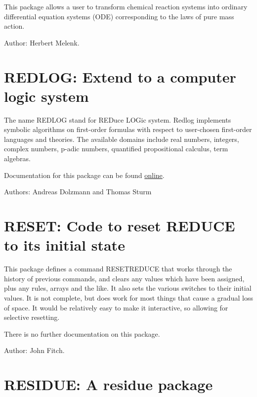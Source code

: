
This package allows a user to transform chemical reaction systems into
ordinary differential equation systems (ODE) corresponding to the laws of
pure mass action.


Author: Herbert Melenk.


\newpage

\section{REDLOG: Extend \REDUCE{} to a computer logic system}


The name REDLOG stand for REDuce LOGic system. Redlog implements
symbolic algorithms on first-order formulas with respect to
user-chosen first-order languages and theories. The available domains
include real numbers, integers, complex numbers, p-adic numbers,
quantified propositional calculus, term algebras.

Documentation for this package can be found \href{http://redlog.eu/}{online}.

Authors: Andreas Dolzmann and Thomas Sturm

\section{RESET: Code to reset REDUCE to its initial state} 

This package defines a command RESETREDUCE that works through the
history of previous commands, and clears any values which have been
assigned, plus any rules, arrays and the like.  It also sets the various
switches to their initial values.  It is not complete, but does work for
most things that cause a gradual loss of space.  It would be relatively
easy to make it interactive, so allowing for selective resetting.

There is no further documentation on this package.

Author: John Fitch.

\newpage

\section{RESIDUE: A residue package} 

